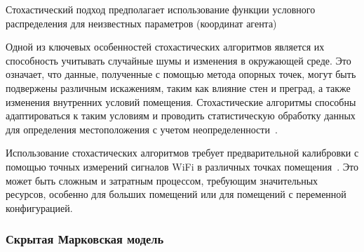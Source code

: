 Стохастический подход предполагает использование функции условного распределения для неизвестных параметров (координат агента)

Одной из ключевых особенностей стохастических алгоритмов является их способность учитывать случайные шумы и изменения в окружающей среде. Это означает, что данные, полученные с помощью метода опорных точек, могут быть подвержены различным искажениям, таким как влияние стен и преград, а также изменения внутренних условий помещения. Стохастические алгоритмы способны адаптироваться к таким условиям и проводить статистическую обработку данных для определения местоположения с учетом неопределенности~\cite{trends}.

Использование стохастических алгоритмов требует предварительной калибровки с помощью точных измерений сигналов WiFi в различных точках помещения~\cite{lin2021probabilistic}. Это может быть сложным и затратным процессом, требующим значительных ресурсов, особенно для больших помещений или для помещений с переменной конфигурацией.

\subsubsection{Скрытая Марковская модель}



